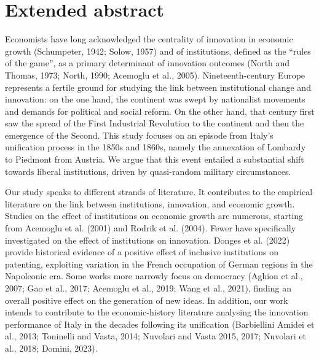 \section*{Extended abstract}
\noindent Economists have long acknowledged the centrality of innovation in economic growth (Schumpeter, 1942; Solow, 1957) and of institutions, defined as the “rules of the game”, as a primary determinant of innovation outcomes (North and Thomas, 1973; North, 1990; Acemoglu et al., 2005). %
Nineteenth-century Europe represents a fertile ground for studying the link between institutional change and innovation: on the one hand, the continent was swept by nationalist movements and demands for political and social reform. On the other hand, that century first saw the spread of the First Industrial Revolution to the continent and then the emergence of the Second. This study focuses on an episode from Italy’s unification process in the 1850s and 1860s, namely the annexation of Lombardy to Piedmont from Austria. We argue that this event entailed a substantial shift towards liberal institutions, driven by quasi-random military circumstances. %

Our study speaks to different strands of literature. It contributes to the empirical literature on the link between institutions, innovation, and economic growth. Studies on the effect of institutions on economic growth are numerous, starting from Acemoglu et al. (2001) and Rodrik et al. (2004). Fewer have specifically investigated on the effect of institutions on innovation. Donges et al. (2022) provide historical evidence of a positive effect of inclusive institutions on patenting, exploiting variation in the  French occupation of German regions in the Napoleonic era. Some works more narrowly focus on democracy (Aghion et al., 2007; Gao et al., 2017; Acemoglu et al., 2019; Wang et al., 2021), finding an overall positive effect on the generation of new ideas. In addition, our work intends to contribute to the economic-history literature analysing the innovation performance of Italy in the decades following its unification (Barbiellini Amidei et al., 2013; Toninelli and Vasta, 2014; Nuvolari and Vasta 2015, 2017; Nuvolari et al., 2018; Domini, 2023).

